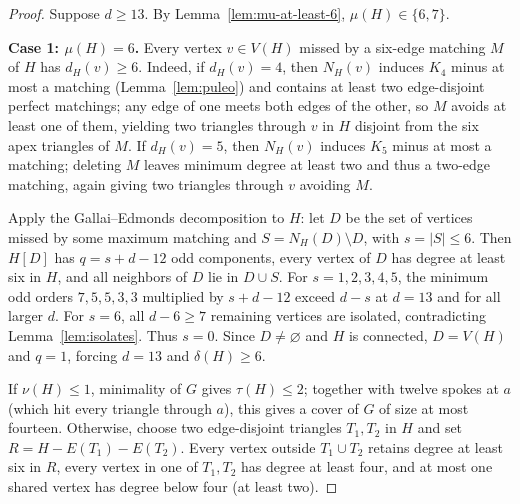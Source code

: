 \documentclass[11pt]{article}
\begin{document}
\begin{proof}
Suppose $d\geq 13$. By Lemma~\ref{lem:mu-at-least-6}, $\mu(H)\in\{6,7\}$.

\medskip
\noindent\textbf{Case 1: $\mu(H)=6$.}
Every vertex $v\in V(H)$ missed by a six-edge matching $M$ of $H$ has $d_H(v)\geq 6$. Indeed, if $d_H(v)=4$, then $N_H(v)$ induces $K_4$ minus at most a matching (Lemma~\ref{lem:puleo}) and contains at least two edge-disjoint perfect matchings; any edge of one meets both edges of the other, so $M$ avoids at least one of them, yielding two triangles through $v$ in $H$ disjoint from the six apex triangles of $M$. If $d_H(v)=5$, then $N_H(v)$ induces $K_5$ minus at most a matching; deleting $M$ leaves minimum degree at least two and thus a two-edge matching, again giving two triangles through $v$ avoiding $M$.

Apply the Gallai--Edmonds decomposition to $H$: let $D$ be the set of vertices missed by some maximum matching and $S=N_H(D)\setminus D$, with $s=|S|\leq 6$. Then $H[D]$ has $q=s+d-12$ odd components, every vertex of $D$ has degree at least six in $H$, and all neighbors of $D$ lie in $D\cup S$. For $s=1,2,3,4,5$, the minimum odd orders $7,5,5,3,3$ multiplied by $s+d-12$ exceed $d-s$ at $d=13$ and for all larger $d$. For $s=6$, all $d-6\geq 7$ remaining vertices are isolated, contradicting Lemma~\ref{lem:isolates}. Thus $s=0$. Since $D\neq\varnothing$ and $H$ is connected, $D=V(H)$ and $q=1$, forcing $d=13$ and $\delta(H)\geq 6$.

If $\nu(H)\leq 1$, minimality of $G$ gives $\tau(H)\leq 2$; together with twelve spokes at $a$ (which hit every triangle through $a$), this gives a cover of $G$ of size at most fourteen. Otherwise, choose two edge-disjoint triangles $T_1,T_2$ in $H$ and set $R=H-E(T_1)-E(T_2)$. Every vertex outside $T_1\cup T_2$ retains degree at least six in $R$, every vertex in one of $T_1,T_2$ has degree at least four, and at most one shared vertex has degree below four (at least two).


\end{proof}
\end{document}
